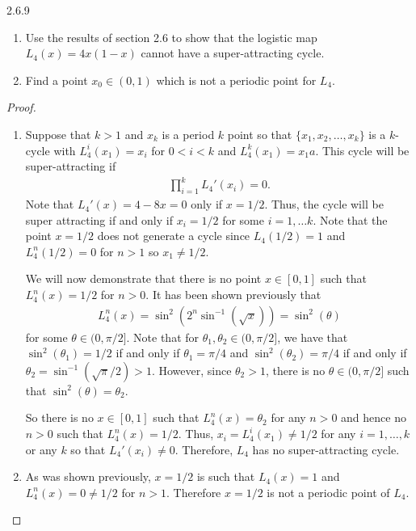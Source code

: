 \begin{problem}{2.6.9}
  \begin{enumerate}
    \item Use the results of section 2.6 to show that the logistic map $L_4(x) = 4x(1-x)$
      cannot have a super-attracting cycle.
    \item Find a point $x_0 \in (0, 1)$ which is not a periodic point for $L_4$.
  \end{enumerate}
\end{problem}

\begin{proof}
  \begin{enumerate}
  \item Suppose that $k > 1$ and $x_k$ is a period $k$ point so that $\{x_1, x_2, \dots, x_k\}$
    is a $k$-cycle with $L_4^i(x_1) = x_i$ for $0 < i < k$ and $L_4^k(x_1) = x_1a$. This cycle will be super-attracting if
    \begin{align*}
      \prod_{i=1}^k L_4'(x_i) = 0.
    \end{align*}
    Note that $L_4'(x) = 4 - 8x = 0$ only if $x=1/2$. Thus, the cycle will be super attracting
    if and only if $x_i = 1/2$ for some $i=1,\dots k$. Note that the point $x = 1/2$ does not generate a cycle since
    $L_4(1/2) = 1$ and $L_4^n(1/2) = 0$ for $n > 1$ so $x_1 \neq 1/2$.

    We will now demonstrate that there is no point $x\in[0, 1]$ such that $L_4^n(x) = 1/2$ for $n>0$.
    It has been shown previously that
    \begin{align*}
      L_4^n(x) = \sin^2\left(2^n\sin^{-1}\left(\sqrt{x}\right)\right)= \sin^2(\theta)
    \end{align*}
    for some $\theta \in (0, \pi/2]$. Note that for $\theta_1, \theta_2 \in(0, \pi/2]$, we have that
    $\sin^2(\theta_1) = 1/2$ if and only if $\theta_1 = \pi/4$ and
    $\sin^2(\theta_2) = \pi/4$ if and only if $\theta_2 = \sin^{-1}\left(\sqrt{\pi}/2\right) > 1$. However, since $\theta_2 > 1$,
    there is no $\theta\in (0, \pi/2]$ such that $\sin^2(\theta) = \theta_2$.

    So there is no $x\in[0,1]$ such that $L_4^n(x) = \theta_2$ for any $n>0$ and hence no $n>0$ such that $L_4^n(x) = 1/2$.
    Thus, $x_i =L_4^i(x_1) \neq 1/2$ for any $i=1,\dots,k$ or any $k$ so that $L_4'(x_i)\neq 0$.
    Therefore, $L_4$ has no super-attracting cycle.
    \item As was shown previously, $x=1/2$ is such that $L_4(x) = 1$ and $L_4^n(x) = 0\neq 1/2$ for $n > 1$.
      Therefore $x=1/2$ is not a periodic point of $L_4$.
  \end{enumerate}
\end{proof}
\newpage

